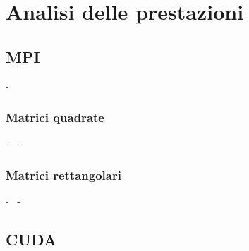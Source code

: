 \documentclass[compress]{beamer}
\begin{document}
\section{Analisi delle prestazioni}

\subsection{MPI}
\begin{frame}{\secname \text{ }- \subsecname\ }
\end{frame}

\subsubsection*{Matrici quadrate}
\begin{frame}{\secname \text{ }- \subsecname\ \text{ }- \subsubsecname}
\end{frame}

\subsubsection*{Matrici rettangolari}
\begin{frame}{\secname \text{ }- \subsecname\ \text{ }- \subsubsecname}
\end{frame}

\subsection{CUDA}
\end{document}
